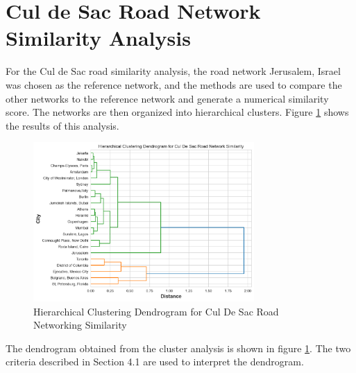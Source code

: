 \section{Cul de Sac Road Network Similarity Analysis}

For the Cul de Sac road similarity analysis, the road network Jerusalem, Israel was chosen as the reference network, and the methods are used to compare the other networks to the reference network and generate a numerical similarity score. The networks are then organized into hierarchical clusters. Figure \ref{fig:Hierarchical Clustering Dendrogram for Cul De Sac Road Networking Similarity} shows the results of this analysis.

\begin{figure}[!ht]
\centering
\includegraphics[width=0.75\textwidth,center]{picture/Cul De Sac/culdesac_dendrogram2.png}
\caption[Hierarchical Clustering Dendrogram for Cul De Sac Road Networking Similarity]{Hierarchical Clustering Dendrogram for Cul De Sac Road Networking Similarity}
\label{fig:Hierarchical Clustering Dendrogram for Cul De Sac Road Networking Similarity}
\end{figure}

The dendrogram obtained from the cluster analysis is shown in figure \ref{fig:Hierarchical Clustering Dendrogram for Cul De Sac Road Networking Similarity}. The two criteria described in Section 4.1 are used to interpret the dendrogram.

